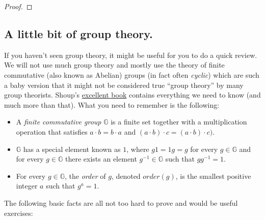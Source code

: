\begin{proof}
\end{proof}

\subsection{A little bit of group
theory.}\label{A-little-bit-of-group-the}

If you haven't seen group theory, it might be useful for you to do a
quick review. We will not use much group theory and mostly use the
theory of finite commutative (also known as Abelian) groups (in fact
often \emph{cyclic}) which are such a baby version that it might not be
considered true ``group theory'' by many group theorists. Shoup's
\href{http://www.shoup.net/ntb/}{excellent book} contains everything we
need to know (and much more than that). What you need to remember is the
following:

\begin{itemize}
\item
  A \emph{finite commutative group} \(\mathbb{G}\) is a finite set
  together with a multiplication operation that satisfies
  \(a\cdot b = b\cdot a\) and
  \((a\cdot b)\cdot c = (a\cdot b)\cdot c)\).
\item
  \(\mathbb{G}\) has a special element known as \(1\), where \(g1=1g=g\)
  for every \(g\in\mathbb{G}\) and for every \(g\in \mathbb{G}\) there
  exists an element \(g^{-1}\in \mathbb{G}\) such that \(gg^{-1}=1\).
\item
  For every \(g\in \mathbb{G}\), the \emph{order} of \(g\), denoted
  \(order(g)\), is the smallest positive integer \(a\) such that
  \(g^a=1\).
\end{itemize}

The following basic facts are all not too hard to prove and would be
useful exercises:

